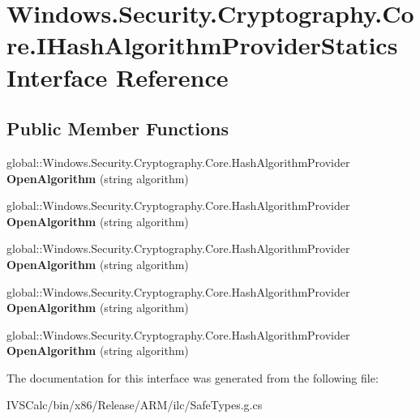 \hypertarget{interface_windows_1_1_security_1_1_cryptography_1_1_core_1_1_i_hash_algorithm_provider_statics}{}\section{Windows.\+Security.\+Cryptography.\+Core.\+I\+Hash\+Algorithm\+Provider\+Statics Interface Reference}
\label{interface_windows_1_1_security_1_1_cryptography_1_1_core_1_1_i_hash_algorithm_provider_statics}
\subsection*{Public Member Functions}
\begin{DoxyCompactItemize}
\item 
\mbox{\label{interface_windows_1_1_security_1_1_cryptography_1_1_core_1_1_i_hash_algorithm_provider_statics_a2e7cb7a4912457ceff8d04c67a83b513}} 
global\+::\+Windows.\+Security.\+Cryptography.\+Core.\+Hash\+Algorithm\+Provider {\bfseries Open\+Algorithm} (string algorithm)
\item 
\mbox{\label{interface_windows_1_1_security_1_1_cryptography_1_1_core_1_1_i_hash_algorithm_provider_statics_a2e7cb7a4912457ceff8d04c67a83b513}} 
global\+::\+Windows.\+Security.\+Cryptography.\+Core.\+Hash\+Algorithm\+Provider {\bfseries Open\+Algorithm} (string algorithm)
\item 
\mbox{\label{interface_windows_1_1_security_1_1_cryptography_1_1_core_1_1_i_hash_algorithm_provider_statics_a2e7cb7a4912457ceff8d04c67a83b513}} 
global\+::\+Windows.\+Security.\+Cryptography.\+Core.\+Hash\+Algorithm\+Provider {\bfseries Open\+Algorithm} (string algorithm)
\item 
\mbox{\label{interface_windows_1_1_security_1_1_cryptography_1_1_core_1_1_i_hash_algorithm_provider_statics_a2e7cb7a4912457ceff8d04c67a83b513}} 
global\+::\+Windows.\+Security.\+Cryptography.\+Core.\+Hash\+Algorithm\+Provider {\bfseries Open\+Algorithm} (string algorithm)
\item 
\mbox{\label{interface_windows_1_1_security_1_1_cryptography_1_1_core_1_1_i_hash_algorithm_provider_statics_a2e7cb7a4912457ceff8d04c67a83b513}} 
global\+::\+Windows.\+Security.\+Cryptography.\+Core.\+Hash\+Algorithm\+Provider {\bfseries Open\+Algorithm} (string algorithm)
\end{DoxyCompactItemize}


The documentation for this interface was generated from the following file\+:\begin{DoxyCompactItemize}
\item 
I\+V\+S\+Calc/bin/x86/\+Release/\+A\+R\+M/ilc/Safe\+Types.\+g.\+cs\end{DoxyCompactItemize}
